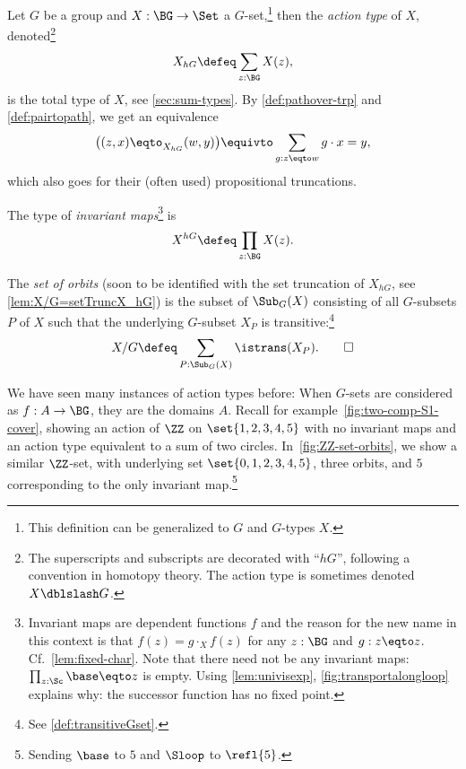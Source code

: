 \begin{definition}\label{def:actiontype} 
  Let $G$ be a group and $X : \BG\to\Set$ a $G$-set,\footnote{%
  This definition can be generalized to \inftygps $G$ and $G$-types $X$.}
  then the \emph{action type}
  of $X$, denoted\footnote{%
    The superscripts and subscripts are decorated with ``$hG$'',
    following a convention in homotopy theory.
    The action type is sometimes denoted $X \dblslash G$.}
\[
  X_{hG} \defeq \sum_{z:\BG} X(z),
\]
is the total type of $X$, see \cref{sec:sum-types}.
By \cref{def:pathover-trp} and \cref{def:pairtopath},
we get an equivalence
\[
\bigl((z,x)\eqto_{X_{hG}}(w,y)\bigr) \equivto
\sum_{g:z\eqto w} g\cdot x = y,
\]
which also goes for their (often used) propositional truncations.

The type of \emph{invariant maps}\footnote{%
Invariant maps are dependent functions $f$ and the reason for the new name
in this context is that $f(z) = g \cdot_X f(z)$ for any $z:\BG$
and $g:z\eqto z$. Cf.~\cref{lem:fixed-char}. Note that there need not 
be any invariant maps: $\prod_{z:\Sc}\base\eqto z$ is empty.
Using \cref{lem:univisexp}, \cref{fig:transportalongloop} explains
why: the successor function has no fixed point.
}
 is
\[
  X^{hG} \defeq \prod_{z:\BG} X(z).
\]

The \emph{set of orbits} (soon to be identified with the
set truncation of $X_{hG}$, see \cref{lem:X/G=setTruncX_hG})
 is the subset of $\Sub_G(X)$ consisting
of all $G$-subsets $P$ of $X$ such that the underlying $G$-subset $X_P$
is transitive:\footnote{See \cref{def:transitiveGset}.}
\[
  X / G \defeq \sum_{P:\Sub_G(X)}\istrans(X_P).\qedhere
\]
\end{definition}

We have seen many instances of action types before:
When $G$-sets are considered as \coverings $f : A \to \BG$,
they are the domains $A$.
Recall for example~\cref{fig:two-comp-S1-cover},
showing an action of $\ZZ$ on $\set{1,2,3,4,5}$ with no invariant maps
and an action type equivalent to a sum of two circles.
In~\cref{fig:ZZ-set-orbits}, we show a similar $\ZZ$-set,
with underlying set $\set{0,1,2,3,4,5}$, three orbits,
and $5$ corresponding to the only invariant map.\footnote{%
Sending $\base$ to $5$ and $\Sloop$ to $\refl{5}$.}

